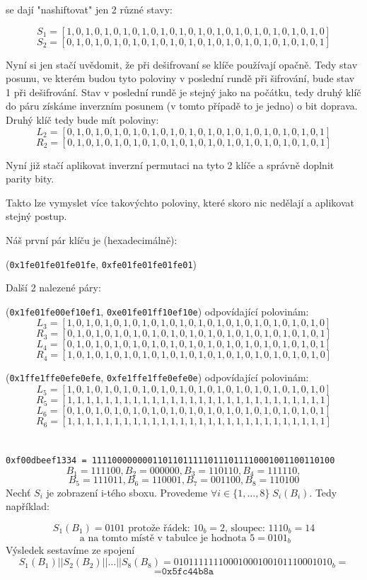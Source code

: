 \documentclass[12pt, a4paper]{article}
\begin{document}
se dají "nashiftovat" jen 2 různé stavy:

$$S_1 =[1, 0, 1, 0, 1, 0, 1, 0, 1, 0, 1, 0, 1, 0, 1, 0, 1, 0, 1, 0, 1, 0, 1, 0, 1, 0, 1, 0]$$
$$S_2 =[0, 1, 0, 1, 0, 1, 0, 1, 0, 1, 0, 1, 0, 1, 0, 1, 0, 1, 0, 1, 0, 1, 0, 1, 0, 1, 0, 1]$$

Nyní si jen stačí uvědomit, že při dešifrovaní se klíče používají opačně. Tedy stav posunu, ve kterém budou tyto poloviny v poslední rundě při šifrování, bude stav 1 při dešifrování. Stav v poslední rundě je stejný jako na počátku, tedy druhý klíč do páru získáme inverzním posunem (v tomto případě to je jedno) o bit doprava. Druhý klíč tedy bude mít poloviny:
$$L_2 =[0, 1, 0, 1, 0, 1, 0, 1, 0, 1, 0, 1, 0, 1, 0, 1, 0, 1, 0, 1, 0, 1, 0, 1, 0, 1, 0, 1]$$
$$R_2 =[0, 1, 0, 1, 0, 1, 0, 1, 0, 1, 0, 1, 0, 1, 0, 1, 0, 1, 0, 1, 0, 1, 0, 1, 0, 1, 0, 1]$$

Nyní již stačí aplikovat inverzní permutaci na tyto 2 klíče a správně doplnit parity bity.

Takto lze vymyslet více takovýchto poloviny, které skoro nic nedělají a aplikovat stejný postup.

Náš první pár klíču je (hexadecimálně): 

(\texttt{0x1fe01fe01fe01fe}, \texttt{0xfe01fe01fe01fe01})

Další 2 nalezené páry:

(\texttt{0x1fe01fe00ef10ef1}, \texttt{0xe01fe01ff10ef10e}) odpovídající polovinám:
$$L_3 = [1, 0, 1, 0, 1, 0, 1, 0, 1, 0, 1, 0, 1, 0, 1, 0, 1, 0, 1, 0, 1, 0, 1, 0, 1, 0, 1, 0]$$
$$R_3 = [0, 1, 0, 1, 0, 1, 0, 1, 0, 1, 0, 1, 0, 1, 0, 1, 0, 1, 0, 1, 0, 1, 0, 1, 0, 1, 0, 1]$$
$$L_4 = [0, 1, 0, 1, 0, 1, 0, 1, 0, 1, 0, 1, 0, 1, 0, 1, 0, 1, 0, 1, 0, 1, 0, 1, 0, 1, 0, 1]$$
$$R_4 = [1, 0, 1, 0, 1, 0, 1, 0, 1, 0, 1, 0, 1, 0, 1, 0, 1, 0, 1, 0, 1, 0, 1, 0, 1, 0, 1, 0]$$

(\texttt{0x1ffe1ffe0efe0efe}, \texttt{0xfe1ffe1ffe0efe0e}) odpovídající polovinám:
$$L_5 = [1, 0, 1, 0, 1, 0, 1, 0, 1, 0, 1, 0, 1, 0, 1, 0, 1, 0, 1, 0, 1, 0, 1, 0, 1, 0, 1, 0]$$
$$R_5 = [1, 1, 1, 1, 1, 1, 1, 1, 1, 1, 1, 1, 1, 1, 1, 1, 1, 1, 1, 1, 1, 1, 1, 1, 1, 1, 1, 1]$$
$$L_6 = [0, 1, 0, 1, 0, 1, 0, 1, 0, 1, 0, 1, 0, 1, 0, 1, 0, 1, 0, 1, 0, 1, 0, 1, 0, 1, 0, 1]$$
$$R_6 = [1, 1, 1, 1, 1, 1, 1, 1, 1, 1, 1, 1, 1, 1, 1, 1, 1, 1, 1, 1, 1, 1, 1, 1, 1, 1, 1, 1]$$

\section{}
\texttt{0xf00dbeef1334 = 111100000000110110111110111011110001001100110100}
\[
B_1 = 111100, B_2 = 000000, B_3 = 110110, B_4 = 111110, 
\]
\[
B_5 = 111011, B_6 = 110001, B_7 = 001100, B_8 = 110100
\]
Nechť $S_i$ je zobrazení i-tého sboxu. Provedeme $\forall i \in \{1, \dots, 8\} \; S_i(B_i)$. Tedy například:

\[
S_1(B_1) = 0101 \text{ protože řádek: } 10_b = 2 \text{, sloupec: } 1110_b = 14 
\]
\[
\text{ a na tomto místě v tabulce je hodnota } 5 = 0101_b
\]
Výsledek sestavíme ze spojení 
$$S_1(B_1)||S_2(B_2)||\dots||S_8(B_8) = 01011111110001000100101110001010_b =$$
$$ = \texttt{0x5fc44b8a}$$
\end{document}
